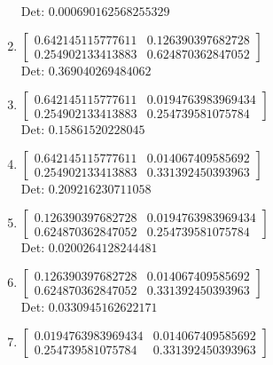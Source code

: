 \documentclass[12pt]{article}
\begin{document}
\begin{enumerate}
Det: $0.000690162568255329$\\

\item $\displaystyle \left[\begin{matrix}0.642145115777611 & 0.126390397682728\\0.254902133413883 & 0.624870362847052\end{matrix}\right]$\\

Det: $0.369040269484062$\\

\item $\displaystyle \left[\begin{matrix}0.642145115777611 & 0.0194763983969434\\0.254902133413883 & 0.254739581075784\end{matrix}\right]$\\

Det: $0.15861520228045$\\

\item $\displaystyle \left[\begin{matrix}0.642145115777611 & 0.014067409585692\\0.254902133413883 & 0.331392450393963\end{matrix}\right]$\\

Det: $0.209216230711058$\\

\item $\displaystyle \left[\begin{matrix}0.126390397682728 & 0.0194763983969434\\0.624870362847052 & 0.254739581075784\end{matrix}\right]$\\

Det: $0.0200264128244481$\\

\item $\displaystyle \left[\begin{matrix}0.126390397682728 & 0.014067409585692\\0.624870362847052 & 0.331392450393963\end{matrix}\right]$\\

Det: $0.0330945162622171$\\

\item $\displaystyle \left[\begin{matrix}0.0194763983969434 & 0.014067409585692\\0.254739581075784 & 0.331392450393963\end{matrix}\right]$\\


\end{enumerate}
\end{document}

